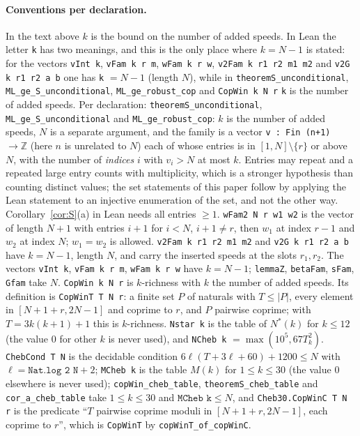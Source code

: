 \documentclass[11pt]{article}
\theoremstyle{definition}
\theoremstyle{remark}
\newcommand{\ZZ}{\mathbb{Z}}
\begin{document}
\paragraph{Conventions per declaration.}
In the text above $k$ is the bound on the number of added speeds. In Lean the letter \texttt{k} has two meanings, and this is the only place where $k=N-1$ is stated: for the vectors \texttt{vInt k}, \texttt{vFam k r m}, \texttt{wFam k r w}, \texttt{v2Fam k r1 r2 m1 m2} and \texttt{v2G k r1 r2 a b} one has \texttt{k} $=N-1$ (length $N$), while in \texttt{theoremS\_unconditional}, \texttt{ML\_ge\_S\_unconditional}, \texttt{ML\_ge\_robust\_cop} and \texttt{CopWin k N r} \texttt{k} is the number of added speeds. Per declaration:
\texttt{theoremS\_unconditional}, \texttt{ML\_ge\_S\_unconditional} and \texttt{ML\_ge\_robust\_cop}: $k$ is the number of added speeds, $N$ is a separate argument, and the family is a vector \texttt{v : Fin (n+1) $\to\ZZ$} (here $n$ is unrelated to $N$) each of whose entries is in $[1,N]\setminus\{r\}$ or above $N$, with the number of \emph{indices} $i$ with $v_i>N$ at most $k$. Entries may repeat and a repeated large entry counts with multiplicity, which is a stronger hypothesis than counting distinct values; the set statements of this paper follow by applying the Lean statement to an injective enumeration of the set, and not the other way. Corollary~\ref{cor:S}(a) in Lean needs all entries $\ge1$. \texttt{wFam2 N r w1 w2} is the vector of length $N+1$ with entries $i+1$ for $i<N$, $i+1\ne r$, then $w_1$ at index $r-1$ and $w_2$ at index $N$; $w_1=w_2$ is allowed. \texttt{v2Fam k r1 r2 m1 m2} and \texttt{v2G k r1 r2 a b} have $k=N-1$, length $N$, and carry the inserted speeds at the slots $r_1,r_2$. The vectors \texttt{vInt k}, \texttt{vFam k r m}, \texttt{wFam k r w} have $k=N-1$; \texttt{lemmaZ}, \texttt{betaFam}, \texttt{sFam}, \texttt{Gfam} take $N$. \texttt{CopWin k N r} is $k$-richness with $k$ the number of added speeds. Its definition is \texttt{CopWinT T N r}: a finite set $P$ of naturals with $T\le|P|$, every element in $[N+1+r,2N-1]$ and coprime to $r$, and $P$ pairwise coprime; with $T=3k(k+1)+1$ this is $k$-richness. \texttt{Nstar k} is the table of $N^*(k)$ for $k\le12$ (the value $0$ for other $k$ is never used), and \texttt{NCheb k} $=\max(10^5,67T_k^2)$. \texttt{ChebCond T N} is the decidable condition $6\ell(T+3\ell+60)+1200\le N$ with $\ell=\texttt{Nat.log 2 N}+2$; \texttt{MCheb k} is the table $M(k)$ for $1\le k\le30$ (the value $0$ elsewhere is never used); \texttt{copWin\_cheb\_table}, \texttt{theoremS\_cheb\_table} and \texttt{cor\_a\_cheb\_table} take $1\le k\le30$ and $\texttt{MCheb k}\le N$, and \texttt{Cheb30.CopWinC T N r} is the predicate ``$T$ pairwise coprime moduli in $[N+1+r,2N-1]$, each coprime to $r$'', which is \texttt{CopWinT} by \texttt{copWinT\_of\_copWinC}.
\end{document}
